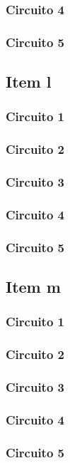 \documentclass[a4paper, 12pt]{article}
\begin{document}
			\subsubsection{Circuito 4}
			\subsubsection{Circuito 5}		
		\subsection{Item l}			
			\subsubsection{Circuito 1}
			\subsubsection{Circuito 2}
			\subsubsection{Circuito 3}
			\subsubsection{Circuito 4}
			\subsubsection{Circuito 5}								
		\subsection{Item m}			
			\subsubsection{Circuito 1}
			\subsubsection{Circuito 2}
			\subsubsection{Circuito 3}
			\subsubsection{Circuito 4}
			\subsubsection{Circuito 5}										
\end{document}

